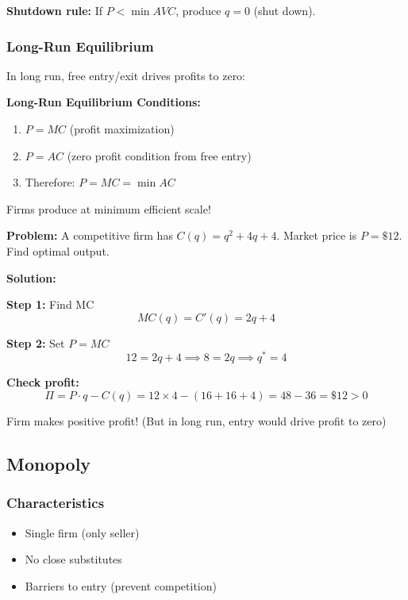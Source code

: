 \documentclass[10pt,letterpaper]{article}
\begin{document}
\textbf{Shutdown rule:} If $P < \min AVC$, produce $q = 0$ (shut down).

\subsubsection{Long-Run Equilibrium}

In long run, free entry/exit drives profits to zero:

\begin{formulabox}
\textbf{Long-Run Equilibrium Conditions:}
\begin{enumerate}
  \item $P = MC$ (profit maximization)
  \item $P = AC$ (zero profit condition from free entry)
  \item Therefore: $\boxed{P = MC = \min AC}$
\end{enumerate}

Firms produce at minimum efficient scale!
\end{formulabox}

\begin{examplebox}
\textbf{Problem:} A competitive firm has $C(q) = q^2 + 4q + 4$. Market price is $P = \$12$. Find optimal output.

\textbf{Solution:}

\textbf{Step 1:} Find MC
\[
MC(q) = C'(q) = 2q + 4
\]

\textbf{Step 2:} Set $P = MC$
\[
12 = 2q + 4 \implies 8 = 2q \implies \boxed{q^* = 4}
\]

\textbf{Check profit:}
\[
\Pi = P \cdot q - C(q) = 12 \times 4 - (16 + 16 + 4) = 48 - 36 = \$12 > 0
\]

Firm makes positive profit! (But in long run, entry would drive profit to zero)
\end{examplebox}

\subsection{Monopoly}

\subsubsection{Characteristics}

\begin{itemize}
  \item Single firm (only seller)
  \item No close substitutes
  \item Barriers to entry (prevent competition)
\end{itemize}
\end{document}
